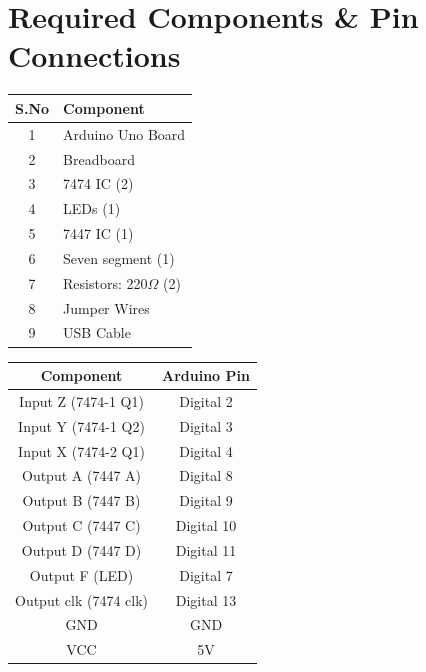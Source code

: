 \documentclass[a4paper,12pt]{article}
\begin{document}
\section*{Required Components \& Pin Connections}
\begin{center}
\begin{minipage}{0.45\textwidth}
\begin{table}[H]
\centering
\begin{tabular}{|c|l|}
\hline
\textbf{S.No} & \textbf{Component} \\ \hline
1 & Arduino Uno Board \\
2 & Breadboard \\
3 & 7474 IC (2) \\
4 & LEDs (1) \\
5 & 7447 IC (1) \\
6 & Seven segment (1) \\
7 & Resistors: 220$\Omega$ (2) \\
8 & Jumper Wires \\
9 & USB Cable \\
\hline
\end{tabular}
\end{table}
\end{minipage}
\hspace{0.05\textwidth}
\begin{minipage}{0.45\textwidth}
\begin{table}[H]
\centering
\begin{tabular}{|c|c|}
\hline
\textbf{Component} & \textbf{Arduino Pin} \\ \hline
Input Z (7474-1 Q1) & Digital 2 \\
Input Y (7474-1 Q2) & Digital 3 \\
Input X (7474-2 Q1) & Digital 4 \\
Output A (7447 A) & Digital 8 \\
Output B (7447 B) & Digital 9 \\
Output C (7447 C) & Digital 10 \\
Output D (7447 D) & Digital 11 \\
Output F (LED) & Digital 7 \\
Output clk (7474 clk) & Digital 13 \\
GND & GND \\
VCC & 5V \\
\hline
\end{tabular}
\end{table}
\end{minipage}
\end{center}
\end{document}
